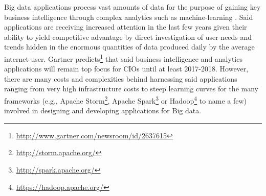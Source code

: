 
Big data applications process vast amounts of data \cite{bdsurvey} for the purpose of gaining key business intelligence through complex analytics such as machine-learning \cite{ml4bd}. Said applications are receiving increased attention in the last few years given their ability to yield competitive advantage by direct investigation of user needs and trends hidden in the enormous quantities of data produced daily by the average internet user. Gartner predicts\footnote{\url{http://www.gartner.com/newsroom/id/2637615}} that said business intelligence and analytics applications will remain top focus for CIOs until at least 2017-2018. 
However, there are many costs and complexities behind harnessing said applications ranging from very high infrastructure costs to steep learning curves for the many frameworks (e.g., Apache Storm\footnote{\url{http://storm.apache.org/}}, Apache Spark\footnote{\url{http://spark.apache.org/}} or Hadoop\footnote{\url{https://hadoop.apache.org/}} to name a few) involved in designing and developing applications for Big data.

